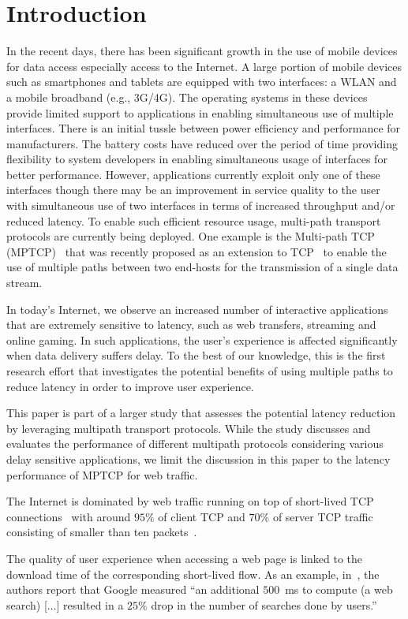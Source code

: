 \section{Introduction}
\label{sec:introduction}
In the recent days, there has been significant growth in the use of mobile devices for data access especially access to the Internet.
A large portion of mobile devices such as smartphones and tablets are equipped with two interfaces: a WLAN and a mobile broadband
(e.g., 3G/4G). The operating systems in these devices provide limited support to applications in enabling simultaneous use of
multiple interfaces. There is an initial tussle between power efficiency and performance for manufacturers. The battery costs
have reduced over the period of time providing flexibility to system developers in enabling simultaneous usage of interfaces for 
better performance. However, applications currently exploit only one of these interfaces though there may be an improvement in service
quality to the user with simultaneous use of two interfaces in terms of increased throughput and/or reduced latency. 
To enable such efficient resource usage, multi-path transport protocols are currently being deployed. 
One example is the Multi-path TCP (MPTCP)~\cite{RFC6824} that was recently proposed as an extension to
TCP~\cite{RFC793} to enable the use of multiple paths between two end-hosts for the transmission of a single data stream.

In today's Internet, we observe an increased number of interactive applications
that are extremely sensitive to latency, such as web transfers, streaming and online gaming. In such applications, the user's experience is affected significantly when data delivery suffers delay. 
To the best of our knowledge, this is the first research effort that investigates the potential benefits of using multiple paths to reduce latency in order to improve user experience.

This paper is part of a larger study that assesses the potential latency reduction by leveraging multipath transport protocols. While the study discusses and evaluates the performance of different multipath protocols considering various delay sensitive applications, we limit the discussion in this paper to the latency performance of MPTCP for web traffic.

The Internet is dominated by web traffic running on top of short-lived TCP connections~\cite{Labovitz-IOR-2009} with
around $95\%$ of client TCP and $70\%$ of server TCP traffic consisting of smaller than ten packets~\cite{Ciullo-IEEECL-2009}.

The quality of user experience when accessing a web page is linked to the download time of the corresponding short-lived flow. As an example,
in~\cite{why-latency-matters-2013}, the authors report that Google measured ``an additional $500$~ms to compute (a web search) [$\ldots$] resulted in a
$25\%$ drop in the number of searches done by users.''


